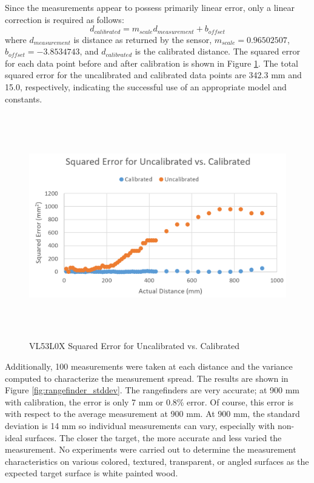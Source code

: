 Since the measurements appear to possess primarily linear error, only a linear correction is required as follows:
\begin{equation}
	d_{calibrated} = m_{scale} d_{measurement} + b_{offset}
\end{equation}
where $d_{measurement} $ is distance as returned by the sensor, $m_{scale} = 0.96502507$, $b_{offset} = -3.8534743$, and $d_{calibrated}$ is the calibrated distance. The squared error for each data point before and after calibration is shown in Figure \ref{fig:rangefinder_calibrated}. The total squared error for the uncalibrated and calibrated data points are 342.3 mm and 15.0, respectively, indicating the successful use of an appropriate model and constants.

\begin{figure}[H]   %
	\centering \includegraphics[width=6in, height=3.85in, keepaspectratio]{figures/rangefinder_calibrated.png}
	\caption{VL53L0X Squared Error for Uncalibrated vs. Calibrated}\label{fig:rangefinder_calibrated}
\end{figure}

Additionally, 100 measurements were taken at each distance and the variance computed to characterize the measurement spread. The results are shown in Figure \ref{fig:rangefinder_stddev}. The rangefinders are very accurate; at 900 mm with calibration, the error is only 7 mm or 0.8\% error. Of course, this error is with respect to the average measurement at 900 mm. At 900 mm, the standard deviation is 14 mm so individual measurements can vary, especially with non-ideal surfaces. The closer the target, the more accurate and less varied the measurement. No experiments were carried out to determine the measurement characteristics on various colored, textured, transparent, or angled surfaces as the expected target surface is white painted wood.

